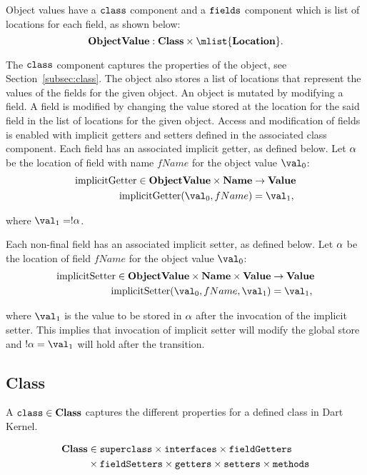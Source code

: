 \documentclass[a4paper,oneside]{article}
\DeclareMathOperator{\getter}{implicitGetter}
\DeclareMathOperator{\setter}{implicitSetter}
\begin{document}
Object values have a $\tt{class}$ component and a $\tt{fields}$ component which is list of locations for each field, as shown below:
\[
    \dobjval : \dclass \times \mlist{\dlocation}.
\]

The $\tt{class}$ component captures the properties of the object, see Section~\eqref{subsec:class}.
The object also stores a list of locations that represent the values of the fields for the given object.
An object is mutated by modifying a field.
A field is modified by changing the value stored at the location for the said field in the list of locations for the given object.
Access and modification of fields is enabled with implicit getters and setters defined in the associated class component.
Each field has an associated implicit getter, as defined below.
Let $\alpha$ be the location of field with name $fName$ for the object value $\val_0$:
\begin{align*}
  \getter \in \dobjval \times \mathbf{Name} &\rightarrow \dval\\
  \getter(\val_0, fName) &= \val_1,
\end{align*}

\noindent where $\val_1 = \deref{\loc}$.

Each non-final field has an associated implicit setter, as defined below.
Let $\alpha$ be the location of field $fName$ for the object value $\val_0$:
\begin{align*}
  \setter \in \dobjval \times \mathbf{Name} \times \dval &\rightarrow \dval\\
  \setter(\val_0, fName, \val_1) &= \val_1,
\end{align*}

\noindent where $\val_1$ is the value to be stored in $\alpha$ after the invocation of the implicit setter.
This implies that invocation of implicit setter will modify the global store and  $\deref{\loc} = \val_1$ will hold after the transition.


\subsection{Class}
\label{subsec:class}

A $\tt{class} \in \mathbf{Class}$ captures the different properties for a defined class in Dart Kernel.

\begin{align}
\notag
\mathbf{Class} &\in \tt{superclass} \times \tt{interfaces} \times \tt{fieldGetters}\\\notag
&\times \tt{fieldSetters} \times \tt{getters} \times \tt{setters} \times \tt{methods}
\end{align}
\end{document}
